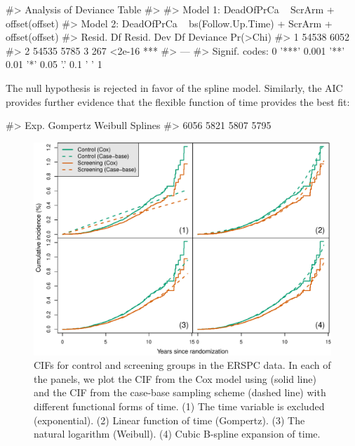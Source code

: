 \documentclass[
]{jss}
\begin{document}
\begin{CodeChunk}

\begin{CodeOutput}
#> Analysis of Deviance Table
#> 
#> Model 1: DeadOfPrCa ~ ScrArm + offset(offset)
#> Model 2: DeadOfPrCa ~ bs(Follow.Up.Time) + ScrArm + offset(offset)
#>   Resid. Df Resid. Dev Df Deviance Pr(>Chi)    
#> 1     54538       6052                         
#> 2     54535       5785  3      267   <2e-16 ***
#> ---
#> Signif. codes:  0 '***' 0.001 '**' 0.01 '*' 0.05 '.' 0.1 ' ' 1
\end{CodeOutput}
\end{CodeChunk}

The null hypothesis is rejected in favor of the spline model. Similarly,
the AIC provides further evidence that the flexible function of time
provides the best fit:

\begin{CodeChunk}

\begin{CodeOutput}
#>     Exp. Gompertz  Weibull  Splines 
#>     6056     5821     5807     5795
\end{CodeOutput}
\end{CodeChunk}

\begin{CodeChunk}
\begin{figure}[ht]
\includegraphics[width=\textwidth,keepaspectratio=true]{../figures/erspc-cox-cif-1} \caption{CIFs for control and screening groups in the ERSPC data. In each of the panels, we plot the CIF from the Cox model using  (solid line) and the CIF from the case-base sampling scheme (dashed line) with different functional forms of time. (1) The time variable is excluded (exponential). (2) Linear function of time (Gompertz). (3) The natural logarithm (Weibull). (4) Cubic B-spline expansion of time.}\label{fig:erspc-cox-cif}
\end{figure}
\end{CodeChunk}
\end{document}
